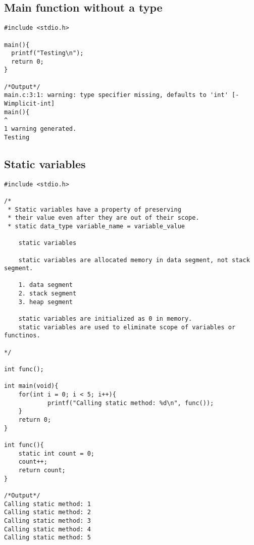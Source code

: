 \documentclass[10pt, a4paper, twocolumn]{article} %
\begin{document}
\subsection{Main function without a type}

\begin{lstlisting}
#include <stdio.h>

main(){
  printf("Testing\n");
  return 0;
}

/*Output*/
main.c:3:1: warning: type specifier missing, defaults to 'int' [-Wimplicit-int]
main(){
^
1 warning generated.
Testing
\end{lstlisting}

\subsection{Static variables}

\begin{lstlisting}
#include <stdio.h>

/*
 * Static variables have a property of preserving
 * their value even after they are out of their scope.
 * static data_type variable_name = variable_value

	static variables

	static variables are allocated memory in data segment, not stack segment.

	1. data segment
	2. stack segment
	3. heap segment

	static variables are initialized as 0 in memory.
	static variables are used to eliminate scope of variables or functinos.

*/

int func();

int main(void){
	for(int i = 0; i < 5; i++){
			printf("Calling static method: %d\n", func());
	}
	return 0;
}

int func(){
	static int count = 0;
	count++;
	return count;
}

/*Output*/
Calling static method: 1
Calling static method: 2
Calling static method: 3
Calling static method: 4
Calling static method: 5
\end{lstlisting}


\printbibliography[title={Bibliography}] %

\end{document}
